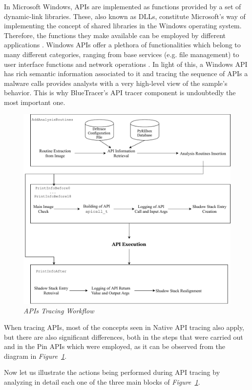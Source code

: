 In Microsoft Windows, APIs are implemented as functions provided by a set of dynamic-link libraries. These, also known as DLLs, constitute Microsoft's way of implementing the concept of shared libraries in the Windows operating system. Therefore, the functions they make available can be employed by different applications \cite{DLL}. Windows APIs offer a plethora of functionalities which belong to many different categories, ranging from base services (e.g. file management) to user interface functions and network operations \cite{WinAPI}. In light of this, a Windows API has rich semantic information associated to it and tracing the sequence of APIs a malware calls provides analysts with a very high-level view of the sample's behavior. This is why BlueTracer's API tracer component is undoubtedly the most important one. 
\begin{figure}[h]
\centering
\vspace{0.5cm}
\includegraphics[scale=0.662]{Figures/APITracing.pdf}
\caption{\textit{APIs Tracing Workflow}}
\label{API Tracing}
\end{figure}
When tracing APIs, most of the concepts seen in Native API tracing also apply, but there are also significant differences, both in the steps that were carried out and in the Pin APIs which were employed, as it can be observed from the diagram in \textit{Figure~\ref{API Tracing}}.

Now let us illustrate the actions being performed during API tracing by analyzing in detail each one of the three main blocks of \textit{Figure~\ref{API Tracing}}.

